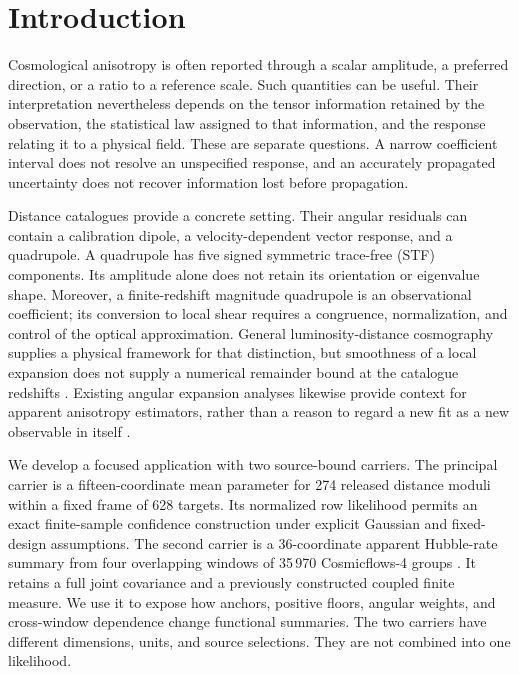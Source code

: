 \section{Introduction}
\label{sec:intro}

Cosmological anisotropy is often reported through a scalar amplitude, a preferred direction, or a ratio to a reference scale. Such quantities can be useful. Their interpretation nevertheless depends on the tensor information retained by the observation, the statistical law assigned to that information, and the response relating it to a physical field. These are separate questions. A narrow coefficient interval does not resolve an unspecified response, and an accurately propagated uncertainty does not recover information lost before propagation.

Distance catalogues provide a concrete setting. Their angular residuals can contain a calibration dipole, a velocity-dependent vector response, and a quadrupole. A quadrupole has five signed symmetric trace-free (STF) components. Its amplitude alone does not retain its orientation or eigenvalue shape. Moreover, a finite-redshift magnitude quadrupole is an observational coefficient; its conversion to local shear requires a congruence, normalization, and control of the optical approximation. General luminosity-distance cosmography supplies a physical framework for that distinction, but smoothness of a local expansion does not supply a numerical remainder bound at the catalogue redshifts \cite{Heinesen2021,Maartens2024}. Existing angular expansion analyses likewise provide context for apparent anisotropy estimators, rather than a reason to regard a new fit as a new observable in itself \cite{Kalbouneh2026}.

We develop a focused application with two source-bound carriers. The principal carrier is a fifteen-coordinate mean parameter for 274 released distance moduli within a fixed frame of 628 targets. Its normalized row likelihood permits an exact finite-sample confidence construction under explicit Gaussian and fixed-design assumptions. The second carrier is a 36-coordinate apparent Hubble-rate summary from four overlapping windows of 35\,970 Cosmicflows-4 groups \cite{Tully2023}. It retains a full joint covariance and a previously constructed coupled finite measure. We use it to expose how anchors, positive floors, angular weights, and cross-window dependence change functional summaries. The two carriers have different dimensions, units, and source selections. They are not combined into one likelihood.

